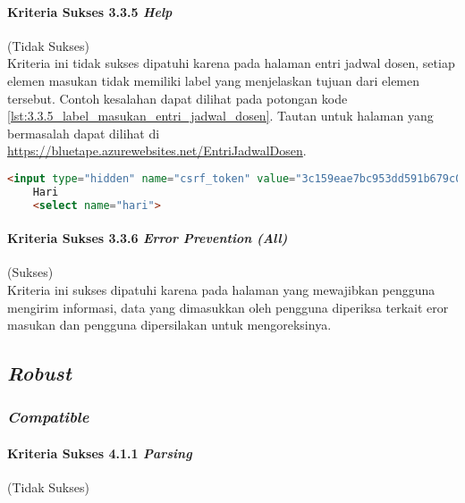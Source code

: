 \paragraph{Kriteria Sukses 3.3.5 \textit{Help}}
\label{par:kepatuhan_bluetape_kriteria_sukses_3.3.5}
(Tidak Sukses)\\

Kriteria ini tidak sukses dipatuhi karena pada halaman entri jadwal dosen, setiap elemen masukan tidak memiliki label yang menjelaskan tujuan dari elemen tersebut. Contoh kesalahan dapat dilihat pada potongan kode \ref{lst:3.3.5_label_masukan_entri_jadwal_dosen}. Tautan untuk halaman yang bermasalah dapat dilihat di \url{https://bluetape.azurewebsites.net/EntriJadwalDosen}.

\begin{lstlisting}[frame=single, label={lst:3.3.5_label_masukan_entri_jadwal_dosen}, language=HTML, caption=Kriteria Sukses 3.3.5 - Tidak Terdapat Label pada Kolom Masukan di Halaman Entri Jadwal Dosen]
    <input type="hidden" name="csrf_token" value="3c159eae7bc953dd591b679c080ed066"/>
    Hari
    <select name="hari">
\end{lstlisting}

\paragraph{Kriteria Sukses 3.3.6 \textit{Error Prevention (All)}}
\label{par:kepatuhan_bluetape_kriteria_sukses_3.3.6}
(Sukses)\\

Kriteria ini sukses dipatuhi karena pada halaman yang mewajibkan pengguna mengirim informasi, data yang dimasukkan oleh pengguna diperiksa terkait eror masukan dan pengguna dipersilakan untuk mengoreksinya.

\subsection{\textit{Robust}}
\label{subsec:kepatuhan_bluetape_robust}

\subsubsection{\textit{Compatible}}
\label{subsubsec:kepatuhan_bluetape_compatible}

\paragraph{Kriteria Sukses 4.1.1 \textit{Parsing}}
\label{par:kepatuhan_bluetape_kriteria_sukses_4.1.1}
(Tidak Sukses)\\

